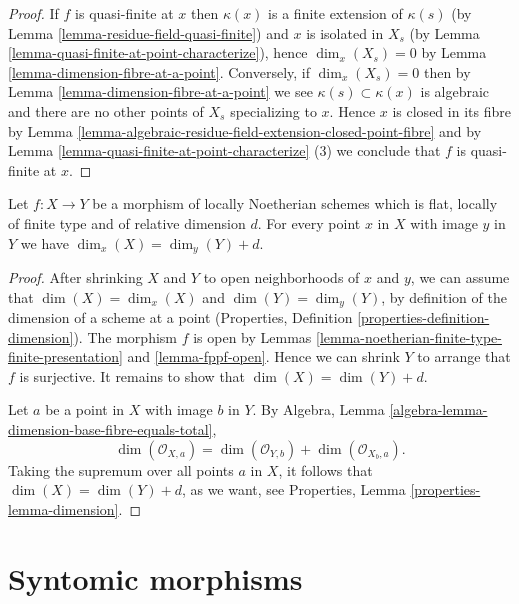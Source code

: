 \begin{proof}
If $f$ is quasi-finite at $x$ then $\kappa(x)$ is a finite extension of
$\kappa(s)$ (by
Lemma \ref{lemma-residue-field-quasi-finite})
and $x$ is isolated in $X_s$ (by
Lemma \ref{lemma-quasi-finite-at-point-characterize}),
hence $\dim_x(X_s) = 0$ by
Lemma \ref{lemma-dimension-fibre-at-a-point}.
Conversely, if $\dim_x(X_s) = 0$ then by
Lemma \ref{lemma-dimension-fibre-at-a-point}
we see $\kappa(s) \subset \kappa(x)$ is algebraic and
there are no other points of $X_s$ specializing to $x$.
Hence $x$ is closed in its fibre by
Lemma \ref{lemma-algebraic-residue-field-extension-closed-point-fibre}
and by
Lemma \ref{lemma-quasi-finite-at-point-characterize} (3)
we conclude that $f$ is quasi-finite at $x$.
\end{proof}

\begin{lemma}
\label{lemma-rel-dimension-dimension}
Let $f : X \to Y$ be a morphism of locally Noetherian schemes
which is flat, locally of finite type and of relative dimension $d$.
For every point $x$ in $X$ with image
$y$ in $Y$ we have $\dim_x(X) = \dim_y(Y) + d$.
\end{lemma}

\begin{proof}
After shrinking $X$ and $Y$ to open neighborhoods of $x$ and $y$,
we can assume that $\dim(X) = \dim_x(X)$ and $\dim(Y) = \dim_y(Y)$,
by definition of the dimension of a scheme at a point
(Properties, Definition \ref{properties-definition-dimension}).
The morphism $f$ is open by Lemmas
\ref{lemma-noetherian-finite-type-finite-presentation} and
\ref{lemma-fppf-open}.
Hence we can shrink $Y$ to arrange that $f$ is surjective.
It remains to show that $\dim(X) = \dim(Y) + d$.

\medskip\noindent
Let $a$ be a point in $X$ with image $b$ in $Y$. By
Algebra, Lemma \ref{algebra-lemma-dimension-base-fibre-equals-total},
$$
\dim(\mathcal{O}_{X,a}) = \dim(\mathcal{O}_{Y,b}) + \dim(\mathcal{O}_{X_b, a}).
$$
Taking the supremum over all points $a$ in $X$, it follows
that $\dim(X) = \dim(Y) + d$, as we want, see
Properties, Lemma \ref{properties-lemma-dimension}.
\end{proof}











\section{Syntomic morphisms}
\label{section-syntomic}

